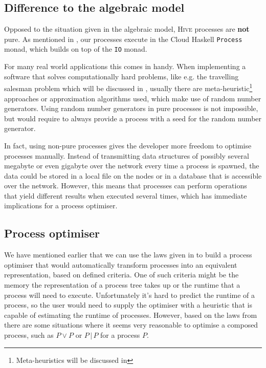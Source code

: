 \subsection{Difference to the algebraic model}
\label{chp:difference_model_implementation}
Opposed to the situation given in the algebraic model, \textsc{Hive} processes are \textbf{not} pure. As mentioned in , our processes execute in the \textsf{Cloud Haskell} \texttt{Process} monad, which builds on top of the \texttt{IO} monad.

For many real world applications this comes in handy. When implementing a software that solves computationally hard problems, like e.g. the travelling salesman problem which will be discussed in , usually there are meta-heuristic\footnote{Meta-heuristics will be discussed in } approaches or approximation algorithms \cite{rolf2006approximationsalgorithmen} used, which make use of random number generators. Using random number generators in pure processes is not impossible, but would require to always provide a process with a seed for the random number generator.

In fact, using non-pure processes gives the developer more freedom to optimise processes manually. Instead of transmitting data structures of possibly several megabyte or even gigabyte over the network every time a process is spawned, the data could be stored in a local file on the nodes or in a database that is accessible over the network. However, this means that processes can perform operations that yield different results when executed several times, which has immediate implications for a process optimiser.

\subsection{Process optimiser}
We have mentioned earlier that we can use the laws given in  to build a process optimiser that would automatically transform processes into an equivalent representation, based on defined criteria. One of such criteria might be the memory the representation of a process tree takes up or the runtime that a process will need to execute. Unfortunately it's hard to predict the runtime of a process, so the user would need to supply the optimiser with a heuristic that is capable of estimating the runtime of processes. However, based on the laws from  there are some situations where it seems very reasonable to optimise a composed process, such as $P \vee P$ or $P \,|\, P$ for a process $P$.


